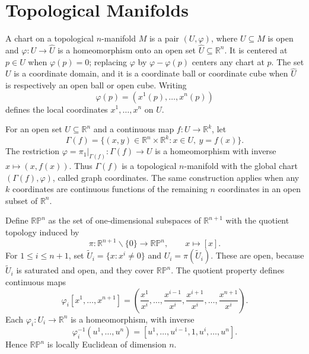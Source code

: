 

\section{Topological Manifolds}

\begin{definition}
\label{def:1-extra-2}



A chart on a topological $n$-manifold $M$ is a pair $(U,\varphi)$, where
$U\subseteq M$ is open and $\varphi:U\to\widehat U$ is a homeomorphism onto
an open set $\widehat U\subseteq\mathbb R^n$. It is centered at $p\in U$ when
$\varphi(p)=0$; replacing $\varphi$ by $\varphi-\varphi(p)$ centers any chart
at $p$. The set $U$ is a coordinate domain, and it is a coordinate ball or
coordinate cube when $\widehat U$ is respectively an open ball or open cube.
Writing
\[
\varphi(p)=(x^1(p),\ldots,x^n(p))
\]
defines the local coordinates $x^1,\ldots,x^n$ on $U$.
\end{definition}

\begin{example}
\label{ex:1-3}




For an open set $U\subseteq\mathbb R^n$ and a continuous map
$f:U\to\mathbb R^k$, let
\[
\Gamma(f)=\{(x,y)\in\mathbb R^n\times\mathbb R^k:x\in U,\ y=f(x)\}.
\]
The restriction $\varphi=\pi_1|_{\Gamma(f)}:\Gamma(f)\to U$ is a
homeomorphism with inverse $x\mapsto(x,f(x))$. Thus $\Gamma(f)$ is a
topological $n$-manifold with the global chart $(\Gamma(f),\varphi)$, called
graph coordinates. The same construction applies when any $k$ coordinates
are continuous functions of the remaining $n$ coordinates in an open subset
of $\mathbb R^n$.
\end{example}

\begin{example}
\label{ex:1-5}




Define $\mathbb{RP}^n$ as the set of one-dimensional subspaces of
$\mathbb R^{n+1}$ with the quotient topology induced by
\[
\pi:\mathbb R^{n+1}\smallsetminus\{0\}\to\mathbb{RP}^n,
\qquad x\mapsto[x].
\]
For $1\leq i\leq n+1$, set
$\widetilde U_i=\{x:x^i\neq0\}$ and $U_i=\pi(\widetilde U_i)$. These are open,
because $\widetilde U_i$ is saturated and open, and they cover
$\mathbb{RP}^n$. The quotient property defines continuous maps
\[
\varphi_i[x^1,\ldots,x^{n+1}]
=\left(\frac{x^1}{x^i},\ldots,\frac{x^{i-1}}{x^i},
\frac{x^{i+1}}{x^i},\ldots,\frac{x^{n+1}}{x^i}\right).
\]
Each $\varphi_i:U_i\to\mathbb R^n$ is a homeomorphism, with inverse
\[
\varphi_i^{-1}(u^1,\ldots,u^n)
=[u^1,\ldots,u^{i-1},1,u^i,\ldots,u^n].
\]
Hence $\mathbb{RP}^n$ is locally Euclidean of dimension $n$.
\end{example}

